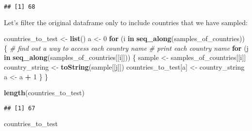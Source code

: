 \documentclass[]{article}
\newenvironment{Shaded}{\begin{snugshade}}{\end{snugshade}}
\newcommand{\CommentTok}[1]{\textcolor[rgb]{0.56,0.35,0.01}{\textit{#1}}}
\newcommand{\ControlFlowTok}[1]{\textcolor[rgb]{0.13,0.29,0.53}{\textbf{#1}}}
\newcommand{\DecValTok}[1]{\textcolor[rgb]{0.00,0.00,0.81}{#1}}
\newcommand{\KeywordTok}[1]{\textcolor[rgb]{0.13,0.29,0.53}{\textbf{#1}}}
\newcommand{\NormalTok}[1]{#1}
\newcommand{\OperatorTok}[1]{\textcolor[rgb]{0.81,0.36,0.00}{\textbf{#1}}}
\newcommand{\StringTok}[1]{\textcolor[rgb]{0.31,0.60,0.02}{#1}}
\begin{document}
\begin{verbatim}
## [1] 68
\end{verbatim}

Let's filter the original dataframe only to include countries that we
have sampled:

\begin{Shaded}
\begin{Highlighting}[]
\NormalTok{countries_to_test <-}\StringTok{ }\KeywordTok{list}\NormalTok{()}
\NormalTok{a <-}\StringTok{ }\DecValTok{0}
\ControlFlowTok{for}\NormalTok{ (i }\ControlFlowTok{in} \KeywordTok{seq_along}\NormalTok{(samples_of_countries))}
\NormalTok{\{}
    \CommentTok{# find out a way to access each country name}
    \CommentTok{# print each country name}
    \ControlFlowTok{for}\NormalTok{ (j }\ControlFlowTok{in} \KeywordTok{seq_along}\NormalTok{(samples_of_countries[[i]]))}
\NormalTok{    \{}
\NormalTok{        sample <-}\StringTok{ }\NormalTok{samples_of_countries[[i]]}
\NormalTok{        country_string <-}\StringTok{ }\KeywordTok{toString}\NormalTok{(sample[[j]])}
\NormalTok{        countries_to_test[a] <-}\StringTok{ }\NormalTok{country_string}
\NormalTok{        a <-}\StringTok{ }\NormalTok{a }\OperatorTok{+}\StringTok{ }\DecValTok{1}
\NormalTok{    \}}
\NormalTok{\}}

\KeywordTok{length}\NormalTok{(countries_to_test)}
\end{Highlighting}
\end{Shaded}

\begin{verbatim}
## [1] 67
\end{verbatim}

\begin{Shaded}
\begin{Highlighting}[]
\NormalTok{countries_to_test}
\end{Highlighting}
\end{Shaded}
\end{document}
